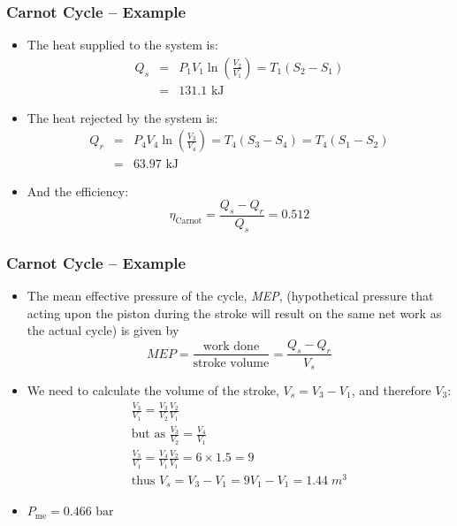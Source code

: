 \documentclass[10pt,compress]{beamer}
\begin{document}
\begin{frame}
 \frametitle{Carnot Cycle -- Example}
    \begin{itemize}
     \item <1-> The heat supplied to the system is:
      \begin{eqnarray}
         Q_{s}&=&P_{1}V_{1}\ln\left(\displaystyle\frac{V_{2}}{V_{1}}\right) = T_{1}\left(S_{2}-S_{1}\right)\nonumber \\
              &=&131.1\text{ kJ}\nonumber
      \end{eqnarray}

     \item <2-> The heat rejected by the system is:
      \begin{eqnarray}
         Q_{r}&=&P_{4}V_{4}\ln\left(\displaystyle\frac{V_{3}}{V_{4}}\right) = T_{4}\left(S_{3}-S_{4}\right) = T_{4}\left(S_{1}-S_{2}\right)\nonumber \\
             &=& 63.97\text{ kJ}\nonumber
      \end{eqnarray}
     \item <3-> And the efficiency:
       \begin{displaymath}
        \eta_{\text{Carnot}}=\displaystyle\frac{Q_{s}-Q_{r}}{Q_{s}}=0.512
       \end{displaymath}  
     
    \end{itemize}
\end{frame}


\begin{frame}
 \frametitle{Carnot Cycle -- Example}
    \begin{itemize}
     \item <1-> The mean effective pressure of the cycle, {\it MEP}, (hypothetical pressure that acting upon the piston during the stroke will result on the same net work as the actual cycle) is given by
       \begin{displaymath}
         MEP=\displaystyle\frac{\text{work done}}{\text{stroke volume}}= \displaystyle\frac{Q_{s}-Q_{r}}{V_{s}}
       \end{displaymath}
     \item <2-> We need to calculate the volume of the stroke, $V_{s}=V_{3}-V_{1}$, and therefore $V_{3}$:
             \begin{eqnarray}
               \displaystyle\frac{V_{3}}{V_{1}}=\displaystyle\frac{V_{3}}{V_{2}}\displaystyle\frac{V_{2}}{V_{1}} \nonumber \\
               \text{but as } \displaystyle\frac{V_{3}}{V_{2}} = \displaystyle\frac{V_{4}}{V_{1}} \nonumber \\
               \displaystyle\frac{V_{3}}{V_{1}}=\displaystyle\frac{V_{4}}{V_{1}}\displaystyle\frac{V_{2}}{V_{1}}=6\times 1.5=9\nonumber \\
               \text{thus } V_{s}=V_{3}-V_{1}=9V_{1}-V_{1}=1.44\;m^{3}\nonumber
             \end{eqnarray}
     \item<3-> $P_{\text{me}}=0.466\text{ bar}$
     
    \end{itemize}
\end{frame}
\end{document}

